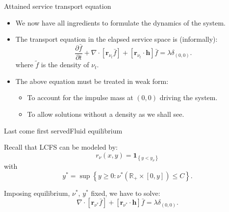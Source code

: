 \documentclass[aspectratio=169]{beamer}
\newcommand{\R}{\mathbb{R}}
\newcommand{\ind}[1]{\mathbf{1}_{\left\{#1\right\}}}
\newenvironment*{myitem}[1][1.5em]{\begin{itemize}\setlength{\itemsep}{#1}}{\end{itemize}}
\begin{document}
\begin{frame}{Attained service transport equation}

	\begin{myitem}
		\item We now have all ingredients to formulate the dynamics of the system.
		\item The transport equation in the elapsed service space is (informally):
		\begin{equation*}
			\frac{\partial \bar f}{\partial t} + \nabla \cdot\left[\mathbf{r}_{\nu_t} \bar{f}\right] + [\mathbf{r}_{\nu_t}\cdot \mathbf{h}]\bar{f}= \lambda \delta_{(0,0)}.
		\end{equation*}
		where $\tilde{f}$ is the density of $\nu_t$.
		\pause
		\item The above equation must be treated in weak form:
		 \begin{itemize}
			\item To account for the impulse mass at $(0,0)$ driving the system.
			\item To allow solutions without a density as we shall see.
		 \end{itemize}
	\end{myitem}


\end{frame}


\begin{frame}{Last come first served}{Fluid equilibrium}

	Recall that LCFS can be modeled by:
	\begin{equation*}
		r_{\nu}(x, y) = \ind{y < y_\nu}
	\end{equation*}
	with
	\begin{equation*}
	y^* = \sup \left\{y \geq 0: \nu^*(\R_+ \times [0, y]) \leqslant C\right\}.
	\end{equation*}

	\pause
	Imposing equilibrium, $\nu^*$, $y^*$ fixed, we have to solve: 
	\begin{equation*}
		\nabla \cdot\left[\mathbf{r}_{\nu^*} \bar{f}\right] + [\mathbf{r}_{\nu^*}\cdot \mathbf{h}]\bar{f}= \lambda \delta_{(0,0)}.
	\end{equation*}

\end{frame}
\end{document}
